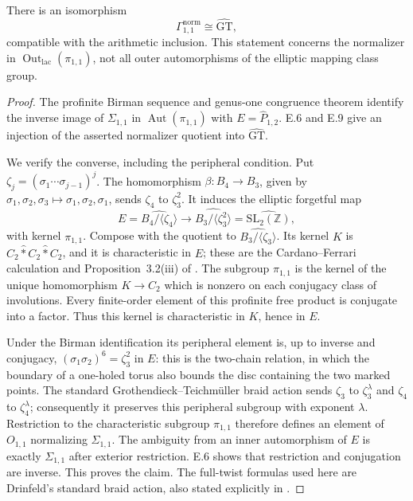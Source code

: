 There is an isomorphism
\[
 \Gamma^{\mathrm{norm}}_{1,1}\cong\widehat{\mathrm{GT}},
\]
compatible with the arithmetic inclusion.  This statement concerns the
normalizer in $\operatorname{Out}_{\mathrm{lac}}(\pi_{1,1})$, not all
outer automorphisms of the elliptic mapping class group.
\begin{proof}
The profinite Birman sequence and genus-one congruence theorem identify
the inverse image of $\Sigma_{1,1}$ in
$\operatorname{Aut}(\pi_{1,1})$ with $E=\widehat P_{1,2}$.
E.6 and E.9 give an injection of the asserted normalizer quotient into
$\widehat{\mathrm{GT}}$.

We verify the converse, including the peripheral condition.  Put
$\zeta_j=(\sigma_1\cdots\sigma_{j-1})^j$.  The homomorphism
$\beta:B_4\to B_3$, given by
$\sigma_1,\sigma_2,\sigma_3\mapsto\sigma_1,\sigma_2,\sigma_1$,
sends $\zeta_4$ to $\zeta_3^2$.  It induces the elliptic forgetful map
\[
 E=\widehat{B_4/\langle\zeta_4\rangle}
   \longrightarrow
 \widehat{B_3/\langle\zeta_3^2\rangle}
   =\widehat{\mathrm{SL}_2(\mathbb Z)},
\]
with kernel $\pi_{1,1}$.  Compose with the quotient to
$\widehat{B_3/\langle\zeta_3\rangle}$.  Its kernel $K$ is
$C_2\mathbin{\widehat *}C_2\mathbin{\widehat *}C_2$, and it is
characteristic in $E$; these are the Cardano--Ferrari calculation and
Proposition~3.2(iii) of \citet{MinamideNakamura2022}.
The subgroup $\pi_{1,1}$ is the kernel of the unique homomorphism
$K\to C_2$ which is nonzero on each conjugacy class of involutions.
Every finite-order element of this profinite free product is conjugate
into a factor.  Thus this kernel is characteristic in $K$, hence in $E$.

Under the Birman identification its peripheral element is, up to inverse
and conjugacy, $(\sigma_1\sigma_2)^6=\zeta_3^2$ in $E$: this is the
two-chain relation, in which the boundary of a one-holed torus also
bounds the disc containing the two marked points.  The standard
Grothendieck--Teichm\"uller braid action sends $\zeta_3$ to
$\zeta_3^\lambda$ and $\zeta_4$ to $\zeta_4^\lambda$; consequently
it preserves this peripheral subgroup with exponent $\lambda$.
Restriction to the characteristic subgroup $\pi_{1,1}$ therefore
defines an element of $O_{1,1}$ normalizing $\Sigma_{1,1}$.
The ambiguity from an inner automorphism of $E$ is exactly $\Sigma_{1,1}$
after exterior restriction.  E.6 shows that restriction and conjugation
are inverse.  This proves the claim.  The full-twist formulas used here
are Drinfeld's standard braid action, also stated explicitly in
\citet[Theorem~2.1]{LochakNakamuraSchneps2026}.
\end{proof}

